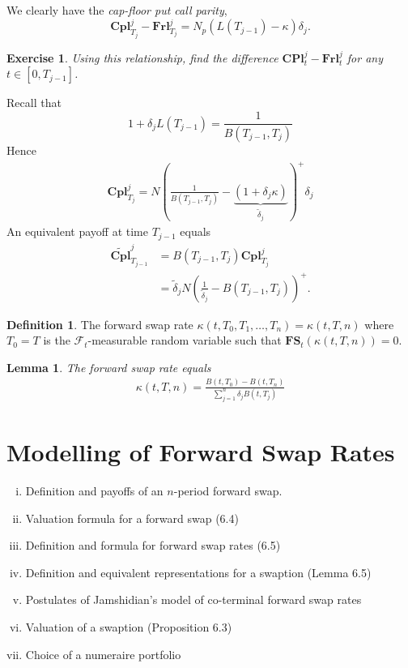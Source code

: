 \documentclass[10pt, oneside, reqno]{amsbook}
\theoremstyle{plain}%
\newtheorem{lem}[thm]{Lemma}
\newtheorem{exer}[thm]{Exercise}
\theoremstyle{definition}
\newtheorem{defn}[thm]{Definition}
\theoremstyle{remark}
\newcommand{\sigf}{\mathcal{F}}
\numberwithin{equation}{chapter}
\begin{document}
We clearly have the \emph{cap-floor put call parity}, \[
    \mathbf{Cpl}^j_{T_j} - \mathbf{Frl}^j_{T_j} = N_p \left(L(T_{j-1}) - \kappa \right) \delta_j. 
\]  

\begin{exer}
    Using this relationship, find the difference $\mathbf{CPl}_t^j - \mathbf{Frl}^j_t$ for any $t \in [0, T_{j-1}]$.
\end{exer}

Recall that \[
    1 + \delta_j L(T_{j-1}) = \frac{1}{B(T_{j-1}, T_j)}
\]  Hence \begin{align*}
    \mathbf{Cpl}^j_{T_j} = N \left( \frac{1}{B(T_{j-1}, T_j)} - \underbrace{(1 + \delta_j \kappa)}_{\tilde \delta_j} \right)^+ \delta_j
\end{align*}  An equivalent payoff at time $T_{j-1}$ equals \begin{align*}
    \tilde{\mathbf{Cpl}}^j_{T_{j-1}} &= B(T_{j-1}, T_j) \mathbf{Cpl}_{T_j}^j \\
                &= \tilde \delta_j N \left( \frac{1}{\tilde \delta_j} - B(T_{j-1}, T_j) \right)^+.
\end{align*}



\begin{defn}
    The forward swap rate $\kappa(t, T_0, T_1, \dots, T_n) = \kappa(t, T, n)$ where $T_0 = T$ is the $\sigf_t$-measurable random variable such that $\mathbf{FS}_t \left( \kappa(t, T, n) \right) = 0$.  
\end{defn}

\begin{lem}
    The forward swap rate equals \begin{align*}
        \kappa(t, T, n) = \frac{B(t, T_0) - B(t, T_n)}{\sum_{j=1}^n \delta_j B(t, T_j)}
    \end{align*}
\end{lem}

\chapter{Modelling of Forward Swap Rates} %
\label{cha:modelling_of_forward_swap_rates}
\begin{enumerate}[(i)]
    \item Definition and payoffs of an $n$-period forward swap.
    \item Valuation formula for a forward swap (6.4)
    \item Definition and formula for forward swap rates (6.5)
    \item Definition and equivalent representations for a swaption (Lemma 6.5)
    \item Postulates of Jamshidian's model of co-terminal forward swap rates
    \item Valuation of a swaption (Proposition 6.3)
    \item Choice of a numeraire portfolio
\end{enumerate}
\end{document}
